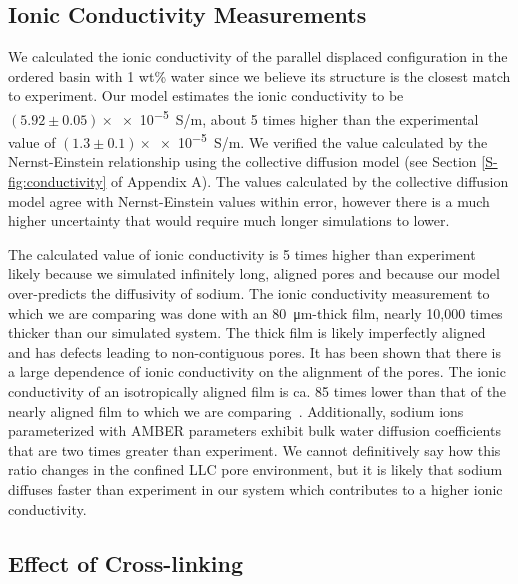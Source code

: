   \subsection{Ionic Conductivity Measurements}
  
  We calculated the ionic conductivity of the parallel displaced configuration in
  the ordered basin with 1 wt\% water since we believe its structure is the 
  closest match to experiment. Our model estimates the ionic conductivity to be
  $(5.92 \pm 0.05)\times$\num{e-5}~S/m, about 5 times higher than the experimental value of 
  $(1.3 \pm 0.1)\times$\num{e-5}~S/m. We verified the value calculated by the Nernst-Einstein
  relationship using the collective diffusion model\cite{liu_collective_2013} 
  (see Section \ref{S-fig:conductivity} of Appendix A). The values calculated by the 
  collective diffusion model agree with Nernst-Einstein values within error, 
  however there is a much higher uncertainty that would require much longer 
  simulations to lower.

  \label{modification:conductivity}
  The calculated value of ionic conductivity is 5 times higher than experiment 
  likely because we simulated infinitely long, aligned pores and because our 
  model over-predicts the diffusivity of sodium. The ionic conductivity measurement 
  to which we are comparing was done with an \SI{80}{\micro\metre}-thick film, 
  nearly 10,000 times thicker than our simulated
  system. The thick film is likely imperfectly aligned and has defects leading to
  non-contiguous pores. It has been shown that there is a large dependence of 
  ionic conductivity on the alignment of the pores. The ionic conductivity of an
  isotropically aligned film is ca. 85 times lower than that of the nearly aligned
  film to which we are comparing~\cite{feng_scalable_2014}. Additionally, sodium 
  ions parameterized with AMBER parameters exhibit bulk water diffusion coefficients
  that are two times greater than experiment\cite{bruce_molecular_2002}. We cannot
  definitively say how this ratio changes in the confined LLC pore environment,
  but it is likely that sodium diffuses faster than experiment in our system which
  contributes to a higher ionic conductivity.
  

  \subsection{Effect of Cross-linking}\label{section:xlink}


